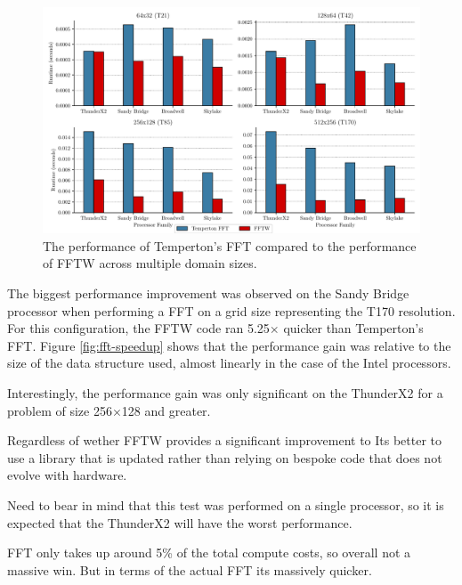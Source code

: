 \documentclass[a4paper,11pt]{report}
\begin{document}
\begin{figure}[htbp]
    \centering
    \includegraphics[width=1\textwidth]{img/compare_fft.pdf}
    \caption[Performance comparison of FFTW and Temperton's FFT]{The performance of Temperton's FFT compared to the performance of FFTW across multiple domain sizes.  }
    \label{fig:fft-times}
\end{figure}
\par
The biggest performance improvement was observed on the Sandy Bridge processor when performing a FFT on a grid size representing the T170 resolution. For this configuration, the FFTW code ran 5.25$\times$ quicker than Temperton's FFT. Figure \ref{fig:fft-speedup} shows that the performance gain was relative to the size of the data structure used, almost linearly in the case of the Intel processors. 
\par
Interestingly, the performance gain was only significant on the ThunderX2 for a problem of size 256$\times$128 and greater. 
\par
Regardless of wether FFTW provides a significant improvement to Its better to use a library that is updated rather than relying on bespoke code that does not evolve with hardware. 
\par
Need to bear in mind that this test was performed on a single processor, so it is expected that the ThunderX2 will have the worst performance. 
\par
FFT only takes up around 5\% of the total compute costs, so overall not a massive win. But in terms of the actual FFT its massively quicker.
\end{document}

